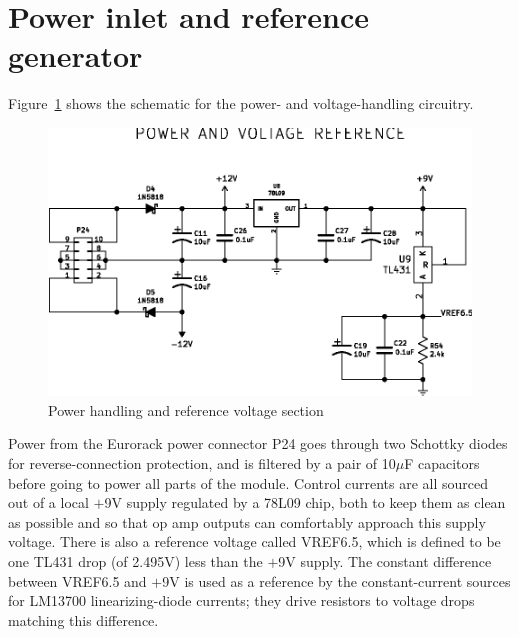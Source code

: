 \section{Power inlet and reference generator}

Figure~\ref{fig:powerref} shows the schematic for the power- and
voltage-handling circuitry.

\begin{figure}
\centering\includegraphics[width=\linewidth]{powerref}\par
\caption{Power handling and reference voltage section}\label{fig:powerref}
\end{figure}

Power from the Eurorack power connector P24 goes through two Schottky diodes
for reverse-connection protection, and is filtered by a pair of 10$\mu$F
capacitors before going to power all parts of the module.  Control currents
are all sourced out of a local $+$9V supply regulated by a 78L09 chip, both
to keep them as clean as possible and so that op amp outputs can comfortably
approach this supply voltage.  There is also a reference voltage called
VREF6.5, which is defined to be one TL431 drop (of 2.495V) less than the
$+$9V supply.  The constant difference between VREF6.5 and $+$9V is used as
a reference by the constant-current sources for LM13700 linearizing-diode
currents; they drive resistors to voltage drops matching this difference.
